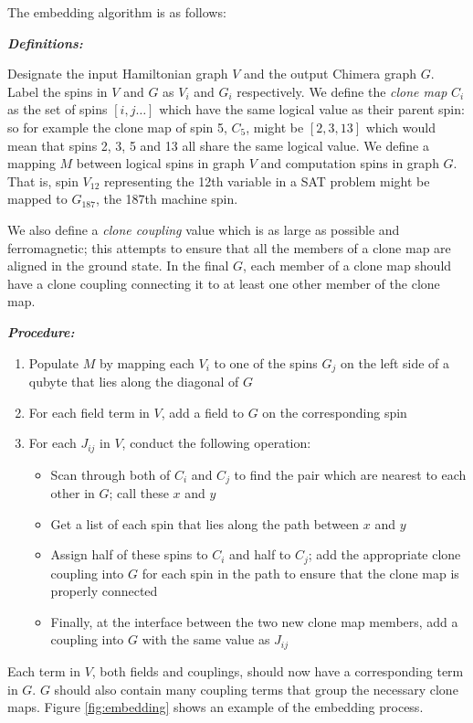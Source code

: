 The embedding algorithm is as follows:

\emph{\textbf{Definitions:}}

Designate the input Hamiltonian graph $V$ and the output Chimera graph $G$.  Label the spins in $V$ and $G$ as $V_i$ and $G_i$ respectively.
We define the \emph{clone map} $C_i$ as the set of spins $[i,j \ldots]$ which have the same logical value as their parent spin: so for example the clone map of spin 5, $C_5$, might be $[2,3,13]$ which would mean that spins 2, 3, 5 and 13 all share the same logical value.  
We define a mapping $M$ between logical spins in graph $V$ and computation spins in graph $G$.  That is, spin $V_{12}$ representing the 12th variable in a SAT problem might be mapped to $G_{187}$, the 187th machine spin.

We also define a \emph{clone coupling} value which is as large as possible and ferromagnetic; this attempts to ensure that all the members of a clone map are aligned in the ground state.  In the final $G$, each member of a clone map should have a clone coupling connecting it to at least one other member of the clone map.

\emph{\textbf{Procedure:}}
\begin{enumerate}
	\item Populate $M$ by mapping each $V_i$ to one of the spins $G_j$ on the left side of a qubyte that lies along the diagonal of $G$
	\item For each field term in $V$, add a field to $G$ on the corresponding spin
	\item For each $J_{ij}$ in $V$, conduct the following operation:
		\begin{itemize}
			\item Scan through both of $C_i$ and $C_j$ to find the pair which are nearest to each other in $G$; call these $x$ and $y$
			\item Get a list of each spin that lies along the path between $x$ and $y$
			\item Assign half of these spins to $C_i$ and half to $C_j$; add the appropriate clone coupling into $G$ for each spin in the path to ensure that the clone map is properly connected
			\item Finally, at the interface between the two new clone map members, add a coupling into $G$ with the same value as $J_{ij}$
		\end{itemize}
\end{enumerate}

Each term in $V$, both fields and couplings, should now have a corresponding term in $G$.  $G$ should also contain many coupling terms that group the necessary clone maps.  Figure \ref{fig:embedding} shows an example of the embedding process.


